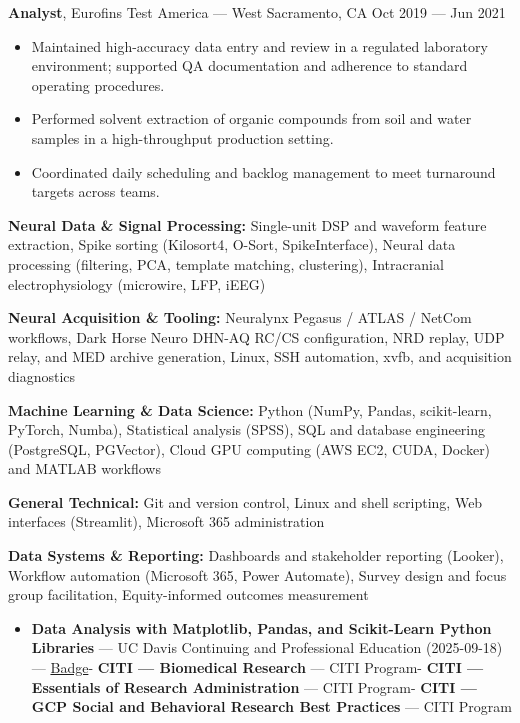\documentclass[11pt]{article}
\providecommand{\tightlist}{\setlength{\itemsep}{0pt}\setlength{\parskip}{0pt}}
\renewcommand{\subsection}[1]{\par\medskip\noindent{\sffamily\bfseries\fontsize{11pt}{0}\selectfont #1}\par\smallskip}
\begin{document}
\textbf{Analyst}, Eurofins Test America --- West Sacramento, CA Oct 2019
--- Jun 2021

\begin{itemize}
\tightlist
\item
  Maintained high-accuracy data entry and review in a regulated
  laboratory environment; supported QA documentation and adherence to
  standard operating procedures.
\item
  Performed solvent extraction of organic compounds from soil and water
  samples in a high-throughput production setting.
\item
  Coordinated daily scheduling and backlog management to meet turnaround
  targets across teams.
\end{itemize}

\subsection{Skills \& Training}\label{skills-training}

\textbf{Neural Data \& Signal Processing:} Single-unit DSP and waveform
feature extraction, Spike sorting (Kilosort4, O-Sort, SpikeInterface),
Neural data processing (filtering, PCA, template matching, clustering),
Intracranial electrophysiology (microwire, LFP, iEEG)

\textbf{Neural Acquisition \& Tooling:} Neuralynx Pegasus / ATLAS /
NetCom workflows, Dark Horse Neuro DHN-AQ RC/CS configuration, NRD
replay, UDP relay, and MED archive generation, Linux, SSH automation,
xvfb, and acquisition diagnostics

\textbf{Machine Learning \& Data Science:} Python (NumPy, Pandas,
scikit-learn, PyTorch, Numba), Statistical analysis (SPSS), SQL and
database engineering (PostgreSQL, PGVector), Cloud GPU computing (AWS
EC2, CUDA, Docker) and MATLAB workflows

\textbf{General Technical:} Git and version control, Linux and shell
scripting, Web interfaces (Streamlit), Microsoft 365 administration

\textbf{Data Systems \& Reporting:} Dashboards and stakeholder reporting
(Looker), Workflow automation (Microsoft 365, Power Automate), Survey
design and focus group facilitation, Equity-informed outcomes
measurement

\subsection{Certifications}\label{certifications}

\begin{itemize}
\tightlist
\item
  \textbf{Data Analysis with Matplotlib, Pandas, and Scikit-Learn Python
  Libraries} --- UC Davis Continuing and Professional Education
  (2025-09-18) ---
  \href{https://www.credly.com/badges/505ef11c-58b4-48bd-aa9e-5a21f0247d46/public_url}{Badge}-
  \textbf{CITI --- Biomedical Research} --- CITI Program- \textbf{CITI
  --- Essentials of Research Administration} --- CITI Program-
  \textbf{CITI --- GCP Social and Behavioral Research Best Practices}
  --- CITI Program
\end{itemize}
\end{document}

